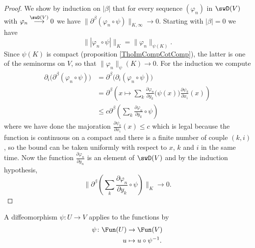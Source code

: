 \begin{proof}
    We show by induction on \( | \beta |\) that for every sequence \( ( \varphi_n)\) in \( \swD(V)\) with \( \varphi_n \stackrel{\swD(V)}{\longrightarrow}0\) we have \(  \| \partial^{\beta}(\varphi_n\circ\psi) \|_{K,\infty}\to 0\). Starting with \( | \beta |=0\) we have
    \begin{equation}
        \| | \varphi_n\circ\psi | \|_K=\| \varphi_n \|_{\psi(K)}.
    \end{equation}
    Since \( \psi(K)\) is compact (proposition \ref{ThoImCompCotComp}), the latter is one of the seminorms on \( V\), so that \( \| \varphi_n \|_\psi(K)\to 0\). For the induction we compute
    \begin{subequations}
        \begin{align}
            \partial_i\big( \partial^{\beta}(\varphi_n\circ\psi) \big)&=\partial^{\beta}\big( \partial_i(\varphi_n\circ\psi) \big)\\
            &=\partial^{\beta}\left(  x\mapsto  \sum_k\frac{ \partial \varphi_n }{ \partial y_k }\big( \psi(x)\big)\frac{ \partial \psi_k }{ \partial x_i }(x) \right)\\
            &\leq c\partial^{\beta}\left( \sum_k\frac{ \partial \varphi_n }{ \partial y_k }\circ\psi \right)
        \end{align}
    \end{subequations}
    where we have done the majoration \( \frac{ \partial \psi_k }{ \partial x_i }(x)\leq c\) which is legal because the function is continuous on a compact and there is a finite number of couple \( (k,i)\), so the bound can be taken uniformly with respect to \( x\), \( k\) and \( i\) in the same time. Now the function \( \frac{ \partial \varphi_n }{ \partial y_n }\) is an element of \( \swD(V)\) and by the induction hypothesis,
    \begin{equation}
       \| \partial^{\beta}\left( \sum_k\frac{ \partial \varphi_n }{ \partial y_k }\circ\psi \right) \|_K\to 0.
    \end{equation}
\end{proof}

A diffeomorphism \( \psi\colon U\to V\) applies to the functions by
\begin{equation}        \label{EQooMZSEooATfSTR}
    \begin{aligned}
        \psi\colon \Fun(U)&\to \Fun(V) \\
        u&\mapsto u\circ\psi^{-1}. 
    \end{aligned}
\end{equation}

